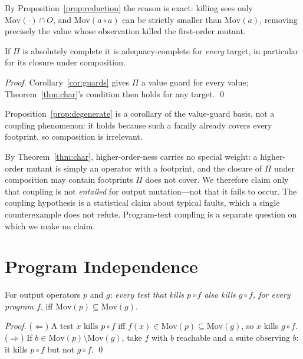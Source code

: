 \documentclass[runningheads,envcountsect,envcountsame]{llncs}
\newcommand{\Mov}{\mathrm{Mov}}
\begin{document}
By Proposition~\ref{prop:reduction} the reason is exact: killing sees only
$\Mov(\cdot) \cap O$, and $\Mov(a \circ a)$ can be strictly smaller than
$\Mov(a)$, removing precisely the value whose observation killed the first-order
mutant.

\begin{proposition}
\label{prop:degenerate}
If $\Pi$ is absolutely complete it is adequacy-complete for \emph{every} target,
in particular for its closure under composition.
\end{proposition}

\begin{proof}
Corollary~\ref{cor:guards} gives $\Pi$ a value guard for every value;
Theorem~\ref{thm:char}'s condition then holds for any target. \qed
\end{proof}

Proposition~\ref{prop:degenerate} is a corollary of the value-guard basis, not a
coupling phenomenon: it holds because such a family already covers every
footprint, so composition is irrelevant.

\begin{remark}
\label{rem:coupling}
By Theorem~\ref{thm:char}, higher-order-ness carries no special weight: a
higher-order mutant is simply an operator with a footprint, and the closure of
$\Pi$ under composition may contain footprints $\Pi$ does not cover. We therefore
claim only that coupling is not \emph{entailed} for output mutation---not that it
fails to occur. The coupling hypothesis is a statistical claim about typical
faults, which a single counterexample does not refute. Program-text coupling is a
separate question on which we make no claim.
\end{remark}

\section{Program Independence}
\label{sec:progindep}

\begin{proposition}
\label{prop:subsume}
For output operators $p$ and $g$: \emph{every test that kills $p \circ f$ also
kills $g \circ f$, for every program $f$}, iff $\Mov(p) \subseteq \Mov(g)$.
\end{proposition}

\begin{proof}
($\Leftarrow$) A test $x$ kills $p \circ f$ iff $f(x) \in \Mov(p) \subseteq
\Mov(g)$, so $x$ kills $g \circ f$. ($\Rightarrow$) If
$b \in \Mov(p) \setminus \Mov(g)$, take $f$ with $b$ reachable and a suite
observing $b$: it kills $p \circ f$ but not $g \circ f$. \qed
\end{proof}
\end{document}
